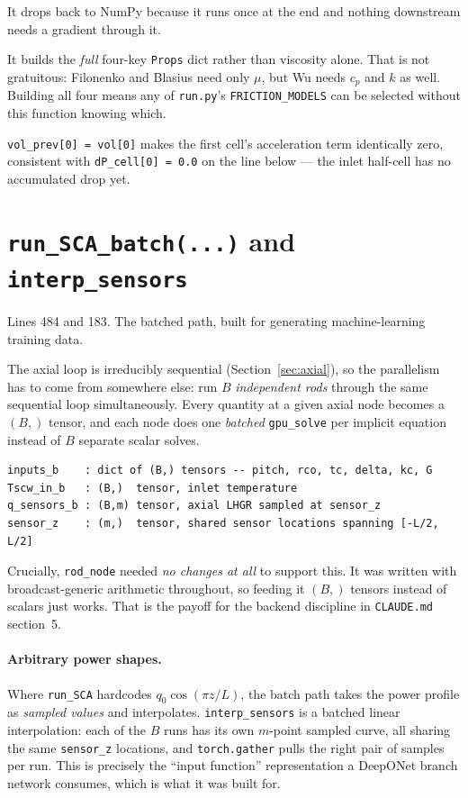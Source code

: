 \documentclass[11pt]{article}
\newcommand{\code}[1]{\texttt{#1}}
\begin{document}
It drops back to NumPy because it runs once at the end and nothing downstream needs a
gradient through it.

It builds the \emph{full} four-key \code{Props} dict rather than viscosity alone. That is
not gratuitous: Filonenko and Blasius need only $\mu$, but Wu needs $c_p$ and $k$ as
well. Building all four means any of \code{run.py}'s \code{FRICTION\_MODELS} can be
selected without this function knowing which.

\code{vol\_prev[0] = vol[0]} makes the first cell's acceleration term identically zero,
consistent with \code{dP\_cell[0] = 0.0} on the line below --- the inlet half-cell has no
accumulated drop yet.

\section{\code{run\_SCA\_batch(...)} and \code{interp\_sensors}}
\label{sec:batch}
Lines 484 and 183. The batched path, built for generating machine-learning training data.

The axial loop is irreducibly sequential (Section~\ref{sec:axial}), so the parallelism
has to come from somewhere else: run $B$ \emph{independent rods} through the same
sequential loop simultaneously. Every quantity at a given axial node becomes a $(B,)$
tensor, and each node does one \emph{batched} \code{gpu\_solve} per implicit equation
instead of $B$ separate scalar solves.

\begin{lstlisting}
inputs_b    : dict of (B,) tensors -- pitch, rco, tc, delta, kc, G
Tscw_in_b   : (B,)  tensor, inlet temperature
q_sensors_b : (B,m) tensor, axial LHGR sampled at sensor_z
sensor_z    : (m,)  tensor, shared sensor locations spanning [-L/2, L/2]
\end{lstlisting}

Crucially, \code{rod\_node} needed \emph{no changes at all} to support this. It was
written with broadcast-generic arithmetic throughout, so feeding it $(B,)$ tensors
instead of scalars just works. That is the payoff for the backend discipline in
\code{CLAUDE.md} section~5.

\paragraph{Arbitrary power shapes.} Where \code{run\_SCA} hardcodes
$q_0\cos(\pi z/L)$, the batch path takes the power profile as \emph{sampled values} and
interpolates. \code{interp\_sensors} is a batched linear interpolation: each of the $B$
runs has its own $m$-point sampled curve, all sharing the same \code{sensor\_z}
locations, and \code{torch.gather} pulls the right pair of samples per run. This is
precisely the ``input function'' representation a DeepONet branch network consumes, which
is what it was built for.
\end{document}
